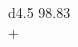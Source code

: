 \documentclass[border = 1mm]{standalone}
\begin{document}
    
\begin{tabular}{d{4.5}}
    98.83 \\
    + \\
     \\
    \hline\\
\end{tabular}
\end{document}
